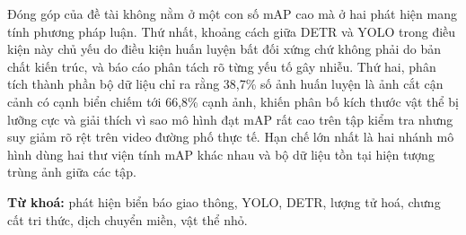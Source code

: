 Đóng góp của đề tài không nằm ở một con số mAP cao mà ở hai phát hiện mang tính phương pháp luận.
Thứ nhất, khoảng cách giữa DETR và YOLO trong điều kiện này chủ yếu do điều kiện huấn luyện bất
đối xứng chứ không phải do bản chất kiến trúc, và báo cáo phân tách rõ từng yếu tố gây nhiễu. Thứ
hai, phân tích thành phần bộ dữ liệu chỉ ra rằng 38,7\% số ảnh huấn luyện là ảnh cắt cận cảnh có
cạnh biển chiếm tới 66,8\% cạnh ảnh, khiến phân bố kích thước vật thể bị lưỡng cực và giải thích
vì sao mô hình đạt mAP rất cao trên tập kiểm tra nhưng suy giảm rõ rệt trên video đường phố thực
tế. Hạn chế lớn nhất là hai nhánh mô hình dùng hai thư viện tính mAP khác nhau và bộ dữ liệu tồn
tại hiện tượng trùng ảnh giữa các tập.

\vspace{0.5cm}
\noindent\textbf{Từ khoá:} phát hiện biển báo giao thông, YOLO, DETR, lượng tử hoá,
chưng cất tri thức, dịch chuyển miền, vật thể nhỏ.
